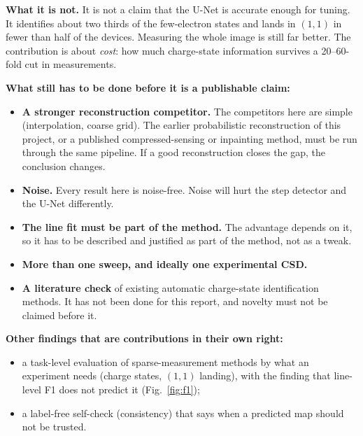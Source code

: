\documentclass[10pt,a4paper]{article}
\begin{document}
\textbf{What it is not.}  It is not a claim that the U-Net is accurate
enough for tuning.  It identifies about two thirds of the few-electron
states and lands in $(1,1)$ in fewer than half of the devices.  Measuring the
whole image is still far better.  The contribution is about \emph{cost}:
how much charge-state information survives a 20--60-fold cut in
measurements.

\textbf{What still has to be done before it is a publishable claim:}
\begin{itemize}
\item \textbf{A stronger reconstruction competitor.}  The competitors here
  are simple (interpolation, coarse grid).  The earlier probabilistic
  reconstruction of this project, or a published compressed-sensing or
  inpainting method, must be run through the same pipeline.  If a good
  reconstruction closes the gap, the conclusion changes.
\item \textbf{Noise.}  Every result here is noise-free.  Noise will hurt
  the step detector and the U-Net differently.
\item \textbf{The line fit must be part of the method.}  The advantage
  depends on it, so it has to be described and justified as part of the
  method, not as a tweak.
\item \textbf{More than one sweep, and ideally one experimental CSD.}
\item \textbf{A literature check} of existing automatic charge-state
  identification methods.  It has not been done for this report, and novelty
  must not be claimed before it.
\end{itemize}

\textbf{Other findings that are contributions in their own right:}
\begin{itemize}
\item a task-level evaluation of sparse-measurement methods by what an
  experiment needs (charge states, $(1,1)$ landing), with the finding that
  line-level F1 does not predict it (Fig.~\ref{fig:f1});
\item a label-free self-check (consistency) that says when a predicted map
  should not be trusted.
\end{itemize}
\end{document}
